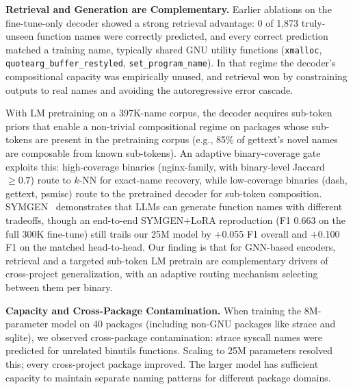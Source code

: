 \documentclass[sigconf,nonacm]{acmart}
\begin{document}
\textbf{Retrieval and Generation are Complementary.}
Earlier ablations on the fine-tune-only decoder showed a strong retrieval advantage: 0 of 1,873 truly-unseen function names were correctly predicted, and every correct prediction matched a training name, typically shared GNU utility functions (\texttt{xmalloc}, \texttt{quotearg\_buffer\_\allowbreak{}restyled}, \texttt{set\_program\_name}). In that regime the decoder's compositional capacity was empirically unused, and retrieval won by constraining outputs to real names and avoiding the autoregressive error cascade.

With LM pretraining on a 397K-name corpus, the decoder acquires sub-token priors that enable a non-trivial compositional regime on packages whose sub-tokens are present in the pretraining corpus (e.g., 85\% of gettext's novel names are composable from known sub-tokens). An adaptive binary-coverage gate exploits this: high-coverage binaries (nginx-family, with binary-level Jaccard $\ge 0.7$) route to $k$-NN for exact-name recovery, while low-coverage binaries (dash, gettext, psmisc) route to the pretrained decoder for sub-token composition. SYMGEN~\cite{symgen} demonstrates that LLMs can generate function names with different tradeoffs, though an end-to-end SYMGEN+LoRA reproduction (F1 0.663 on the full 300K fine-tune) still trails our 25M model by +0.055 F1 overall and +0.100 F1 on the matched head-to-head. Our finding is that for GNN-based encoders, retrieval and a targeted sub-token LM pretrain are complementary drivers of cross-project generalization, with an adaptive routing mechanism selecting between them per binary.

\textbf{Capacity and Cross-Package Contamination.}
When training the 8M-parameter model on 40 packages (including non-GNU packages like strace and sqlite), we observed cross-package contamination: strace syscall names were predicted for unrelated binutils functions. Scaling to 25M parameters resolved this; every cross-project package improved. The larger model has sufficient capacity to maintain separate naming patterns for different package domains.
\end{document}
